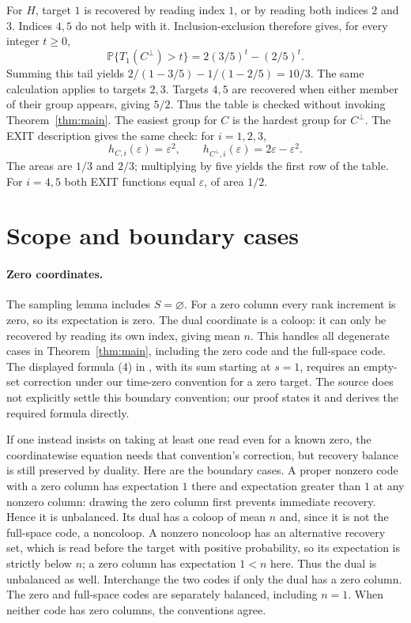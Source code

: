 \documentclass[11pt]{article}
\theoremstyle{remark}
\newcommand{\Prob}{\mathbb P}
\begin{document}
For $H$, target $1$ is recovered by reading index $1$, or by reading both
indices $2$ and $3$. Indices $4,5$ do not help with it. Inclusion-exclusion
therefore gives, for every integer $t\geq0$,
\[
 \Prob\{T_1(C^\perp)>t\}=2(3/5)^t-(2/5)^t.
\]
Summing this tail yields $2/(1-3/5)-1/(1-2/5)=10/3$.
The same calculation applies to targets $2,3$. Targets $4,5$ are recovered
when either member of their group appears, giving $5/2$.
Thus the table is checked without invoking Theorem~\ref{thm:main}.
The easiest group for $C$ is the hardest group for $C^\perp$.
The EXIT description gives the same check: for $i=1,2,3$,
\[
 h_{C,i}(\varepsilon)=\varepsilon^2,\qquad
 h_{C^\perp,i}(\varepsilon)=2\varepsilon-\varepsilon^2.
\]
The areas are $1/3$ and $2/3$; multiplying by five yields the first row of
the table. For $i=4,5$ both EXIT functions equal $\varepsilon$, of area
$1/2$.

\section{Scope and boundary cases}
\paragraph{Zero coordinates.}
The sampling lemma includes $S=\varnothing$. For a zero column every rank
increment is zero, so its expectation is zero. The dual coordinate is a
coloop: it can only be recovered by reading its own index, giving mean $n$.
This handles all degenerate cases in Theorem~\ref{thm:main}, including the
zero code and the full-space code. The displayed formula (4) in
\cite{GBRY}, with its sum starting at $s=1$, requires an empty-set correction
under our time-zero convention for a zero target. The source does not
explicitly settle this boundary convention; our proof states it and derives
the required formula directly.

If one instead insists on taking at least one read even for a known zero,
the coordinatewise equation needs that convention's correction, but
recovery balance is still preserved by duality. Here are the boundary cases.
A proper nonzero code with a zero column has expectation $1$ there and
expectation greater than $1$ at any nonzero column: drawing the zero column
first prevents immediate recovery. Hence it is unbalanced. Its dual has a
coloop of mean $n$ and, since it is not the full-space code, a noncoloop.
A nonzero noncoloop has an alternative recovery set, which is read before
the target with positive probability, so its expectation is strictly below
$n$; a zero column has expectation $1<n$ here. Thus the dual is unbalanced
as well. Interchange the two codes if only the dual has a zero column.
The zero and full-space codes are separately balanced, including $n=1$.
When neither code has zero columns, the conventions agree.
\end{document}
